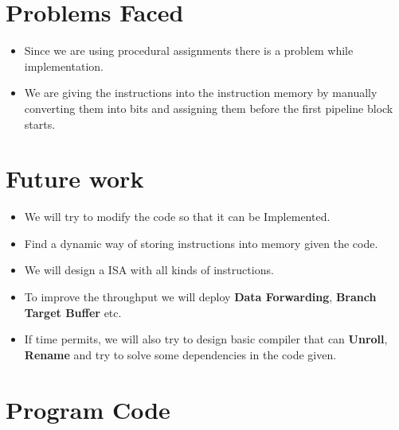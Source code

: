 \documentclass{article}
\begin{document}
\section*{Problems Faced}

\begin{itemize}
    \item Since we are using procedural assignments there is a problem while implementation.
    \item We are giving the instructions into the instruction memory by manually converting them into bits and assigning them before the first pipeline block starts.

\end{itemize}

\section*{Future work}

\begin{itemize}
    \item We will try to modify the code so that it can be Implemented.
    \item Find a dynamic way of storing instructions into memory given the code.
    \item We will design a ISA with all kinds of instructions.
    \item To improve the throughput we will deploy \textbf{Data Forwarding}, \textbf{Branch Target Buffer} etc.
    \item If time permits, we will also try to design basic compiler that can \textbf{Unroll}, \textbf{Rename} and try to solve some dependencies in the code given.

\end{itemize}

\newpage
\section*{Program Code}
\end{document}
